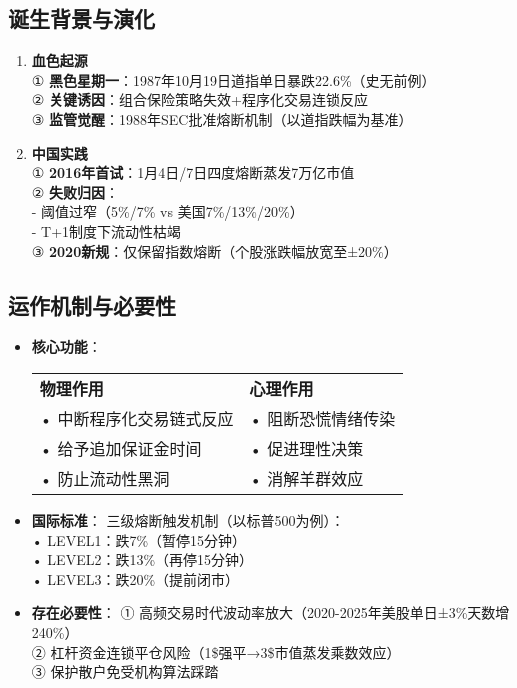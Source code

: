 \subsection{诞生背景与演化}
\begin{enumerate}[leftmargin=*, nosep]
    \item \textbf{血色起源}  \\
    ① \textbf{黑色星期一}：1987年10月19日道指单日暴跌22.6\%（史无前例）\\
    ② \textbf{关键诱因}：组合保险策略失效+程序化交易连锁反应\\
    ③ \textbf{监管觉醒}：1988年SEC批准熔断机制（以道指跌幅为基准）
    
    \item \textbf{中国实践}  \\
    ① \textbf{2016年首试}：1月4日/7日四度熔断蒸发7万亿市值\\
    ② \textbf{失败归因}：\\
    - 阈值过窄（5\%/7\% vs 美国7\%/13\%/20\%）\\
    - T+1制度下流动性枯竭\\
    ③ \textbf{2020新规}：仅保留指数熔断（个股涨跌幅放宽至±20\%）
\end{enumerate}

\subsection{运作机制与必要性}
\begin{itemize}[leftmargin=*, nosep]
    \item \textbf{核心功能}：  
    \begin{tabular}{p{6cm}p{6cm}}
        \textbf{物理作用} & \textbf{心理作用} \\
        • 中断程序化交易链式反应 & • 阻断恐慌情绪传染 \\
        • 给予追加保证金时间 & • 促进理性决策 \\
        • 防止流动性黑洞 & • 消解羊群效应 \\
    \end{tabular}
    
    \item \textbf{国际标准}：  
    三级熔断触发机制（以标普500为例）：  \\
    • LEVEL1：跌7\%（暂停15分钟）\\
    • LEVEL2：跌13\%（再停15分钟）\\
    • LEVEL3：跌20\%（提前闭市）
    
    \item \textbf{存在必要性}：  
    ① 高频交易时代波动率放大（2020-2025年美股单日±3\%天数增240\%）\\
    ② 杠杆资金连锁平仓风险（1\$强平→3\$市值蒸发乘数效应）\\
    ③ 保护散户免受机构算法踩踏
\end{itemize}

